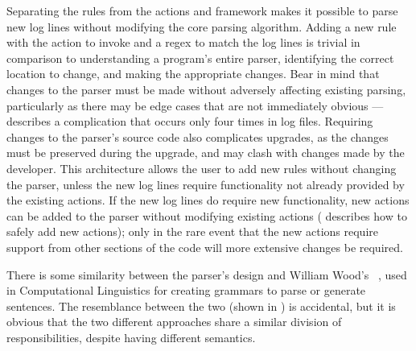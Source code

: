 Separating the rules from the actions and framework makes it possible to
parse new log lines without modifying the core parsing algorithm.  Adding a
new rule with the action to invoke and a regex to match the log lines is
trivial in comparison to understanding a program's entire parser,
identifying the correct location to change, and making the appropriate
changes.  Bear in mind that changes to the parser must be made without
adversely affecting existing parsing, particularly as there may be edge
cases that are not immediately obvious ---
 describes a complication
that occurs only four times in \numberOFlogFILES{} log files.  Requiring
changes to the parser's source code also complicates upgrades, as the
changes must be preserved during the upgrade, and may clash with changes
made by the developer.  This architecture allows the user to add new rules
without changing the parser, unless the new log lines require functionality
not already provided by the existing actions.  If the new log lines do
require new functionality, new actions can be added to the parser without
modifying existing actions ( describes how to safely add new actions); only in the rare
event that the new actions require support from other sections of the code
will more extensive changes be required.

There is some similarity between the parser's design and William Wood's
~\cite{atns}, used in Computational Linguistics for creating
grammars to parse or generate sentences.  The resemblance between the two
(shown in ) is
accidental, but it is obvious that the two different approaches share a
similar division of responsibilities, despite having different semantics.


